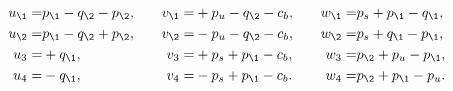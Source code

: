 \begin{equation}  
\begin{aligned} u_\1=& p_\1-q_\2-p_\2,\\
         u_\2=& p_\1-q_\2+p_\2, \\
        u_3=& +q_\1,\\
        u_4=& -q_\1,
\end{aligned}\qquad
\begin{aligned} 
       v_\1=& +p_u-q_\2-c_b,\\
         v_\2=& -p_u-q_\2-c_b,\\
         v_3=& +p_s+p_\1-c_b,\\
        v_4=& -p_s+p_\1-c_b. 
\end{aligned}\qquad
\begin{aligned} w_\1=& p_s+p_\1-q_\1,\\
         w_\2=& p_s+q_\1-p_\1, \\
        w_3=& p_\2+p_u-p_\1,\\
        w_4=& p_\2+p_\1-p_u.
\end{aligned}\end{equation}

